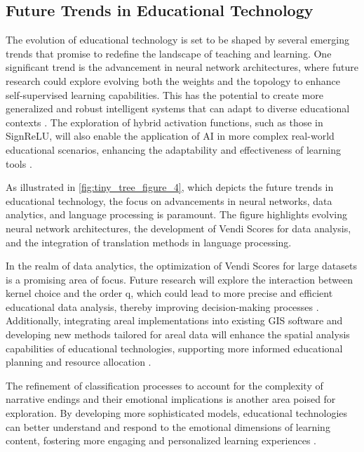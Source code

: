 \subsection{Future Trends in Educational Technology} \label{subsec:Future Trends in Educational Technology}

The evolution of educational technology is set to be shaped by several emerging trends that promise to redefine the landscape of teaching and learning. One significant trend is the advancement in neural network architectures, where future research could explore evolving both the weights and the topology to enhance self-supervised learning capabilities. This has the potential to create more generalized and robust intelligent systems that can adapt to diverse educational contexts \cite{le2019evolvingselfsupervisedneuralnetworks}. The exploration of hybrid activation functions, such as those in SignReLU, will also enable the application of AI in more complex real-world educational scenarios, enhancing the adaptability and effectiveness of learning tools \cite{stogin2022provablystableneuralnetwork}.

As illustrated in \autoref{fig:tiny_tree_figure_4}, which depicts the future trends in educational technology, the focus on advancements in neural networks, data analytics, and language processing is paramount. The figure highlights evolving neural network architectures, the development of Vendi Scores for data analysis, and the integration of translation methods in language processing.

In the realm of data analytics, the optimization of Vendi Scores for large datasets is a promising area of focus. Future research will explore the interaction between kernel choice and the order q, which could lead to more precise and efficient educational data analysis, thereby improving decision-making processes \cite{pasarkar2024cousinsvendiscorefamily}. Additionally, integrating areal implementations into existing GIS software and developing new methods tailored for areal data will enhance the spatial analysis capabilities of educational technologies, supporting more informed educational planning and resource allocation \cite{vidanapathirana2022clusterdetectioncapabilitiesaverage}.

The refinement of classification processes to account for the complexity of narrative endings and their emotional implications is another area poised for exploration. By developing more sophisticated models, educational technologies can better understand and respond to the emotional dimensions of learning content, fostering more engaging and personalized learning experiences \cite{jannidis2016analyzingfeaturesdetectionhappy}.


